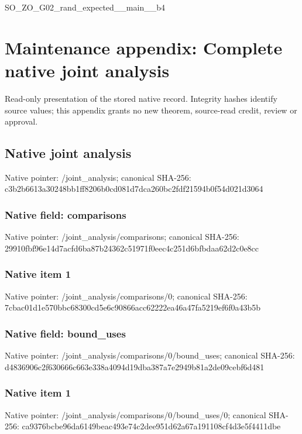 \documentclass[10pt,a4paper]{article}
\begin{document}
\begingroup\raggedright\sloppy SO\_\allowbreak{}ZO\_\allowbreak{}G02\_\allowbreak{}rand\_\allowbreak{}expected\_\allowbreak{}\_\allowbreak{}main\_\allowbreak{}\_\allowbreak{}b4\par\endgroup

\section{Maintenance appendix: Complete native joint analysis}
Read-only presentation of the stored native record. Integrity hashes identify source values; this appendix grants no new theorem, source-read credit, review or approval.

\subsection{Native joint analysis}
Native pointer: /joint\_\allowbreak{}analysis; canonical SHA-256: c3b2b6613a30248bb1ff8206b0cd081d7dca260bc2fdf21594b0f54d021d3064

\subsubsection{Native field: comparisons}
Native pointer: /joint\_\allowbreak{}analysis/comparisons; canonical SHA-256: 29910fbf96e14d7acfd6ba87b24362c51971f0eec4c251d6bfbdaa62d2c0e8cc

\subsubsection{Native item 1}
Native pointer: /joint\_\allowbreak{}analysis/comparisons/0; canonical SHA-256: 7cbac01d1e570bbc68300cd5e6c90866acc62222ea46a47fa5219ef6f0a43b5b

\subsubsection{Native field: bound\_\allowbreak{}uses}
Native pointer: /joint\_\allowbreak{}analysis/comparisons/0/bound\_\allowbreak{}uses; canonical SHA-256: d4836906c2f630666c663e338a4094d19dba387a7e2949b81a2de09cebf6d481

\subsubsection{Native item 1}
Native pointer: /joint\_\allowbreak{}analysis/comparisons/0/bound\_\allowbreak{}uses/0; canonical SHA-256: ca9376bcbe96da6149beac493e74c2dee951d62a67a191108cf4d3e5f4411dbe
\end{document}
